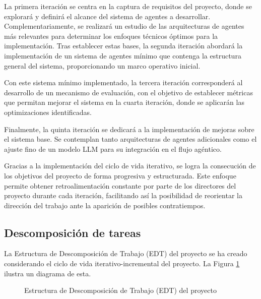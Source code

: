 La primera iteración se centra en la captura de requisitos del proyecto, donde se explorará y definirá el alcance del sistema de agentes a desarrollar. Complementariamente, se realizará un estudio de las arquitecturas de agentes más relevantes para determinar los enfoques técnicos óptimos para la implementación. Tras establecer estas bases, la segunda iteración abordará la implementación de un sistema de agentes mínimo que contenga la estructura general del sistema, proporcionando un marco operativo inicial.

Con este sistema mínimo implementado, la tercera iteración corresponderá al desarrollo de un mecanismo de evaluación, con el objetivo de establecer métricas que permitan mejorar el sistema en la cuarta iteración, donde se aplicarán las optimizaciones identificadas. 

Finalmente, la quinta iteración se dedicará a la implementación de mejoras sobre el sistema base. Se contemplan tanto arquitecturas de agentes adicionales como el ajuste fino de un modelo LLM para su integración en el flujo agéntico. 

Gracias a la implementación del ciclo de vida iterativo, se logra la consecución de los objetivos del proyecto de forma progresiva y estructurada. Este enfoque permite obtener retroalimentación constante por parte de los directores del proyecto durante cada iteración, facilitando así la posibilidad de reorientar la dirección del trabajo ante la aparición de posibles contratiempos.

\subsection{Descomposición de tareas}
La Estructura de Descomposición de Trabajo (EDT) del proyecto se ha creado considerando el ciclo de vida iterativo-incremental del proyecto. La Figura \ref{fig:edt} ilustra un diagrama de esta. 

\begin{figure}[hbtp]
  \centering
  \caption{Estructura de Descomposición de Trabajo (EDT) del proyecto}
  \label{fig:edt}
\end{figure}



